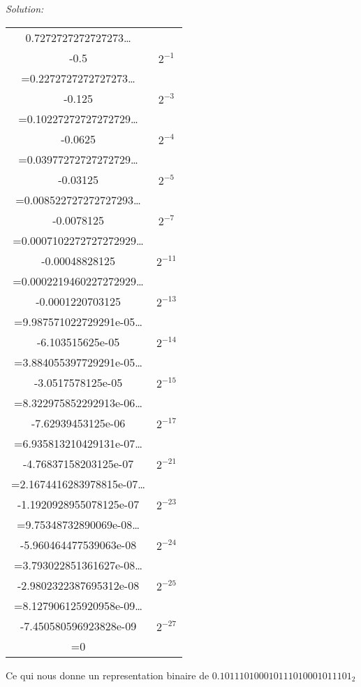 \documentclass{article}
\newenvironment{solution}
    {\textit{Solution:}}
    {}
\begin{document}
\begin{solution}
    \begin{tabular}{|c|c|}
        \hline
        0.7272727272727273\dots \\
        -0.5 & $2^{-1}$\\
        \hline
        =0.2272727272727273\dots \\
        -0.125 & $2^{-3}$\\
        \hline
        =0.10227272727272729\dots \\
        -0.0625 & $2^{-4}$\\
        \hline
        =0.03977272727272729\dots \\
        -0.03125 & $2^{-5}$\\
        \hline
        =0.008522727272727293\dots \\
        -0.0078125 & $2^{-7}$\\
        \hline
        =0.0007102272727272929\dots \\
        -0.00048828125 & $2^{-11}$\\
        \hline
        =0.0002219460227272929\dots \\
        -0.0001220703125 & $2^{-13}$\\
        \hline
        =9.987571022729291e-05\dots \\
        -6.103515625e-05 & $2^{-14}$\\
        \hline
        =3.884055397729291e-05\dots \\
        -3.0517578125e-05 & $2^{-15}$\\
        \hline
        =8.322975852292913e-06\dots \\
        -7.62939453125e-06 & $2^{-17}$\\
        \hline
        =6.935813210429131e-07\dots \\
        -4.76837158203125e-07 & $2^{-21}$\\
        \hline
        =2.1674416283978815e-07\dots \\
        -1.1920928955078125e-07 & $2^{-23}$\\
        \hline
        =9.75348732890069e-08\dots \\
        -5.960464477539063e-08 & $2^{-24}$\\
        \hline
        =3.793022851361627e-08\dots \\
        -2.9802322387695312e-08 & $2^{-25}$\\
        \hline
        =8.127906125920958e-09\dots \\
        -7.450580596923828e-09 & $2^{-27}$\\
        \hline
        =0 & \\
        \hline
    \end{tabular}
    Ce qui nous donne un representation binaire de $0.101110100010111010001011101_2$\\


\end{solution}
\end{document}
